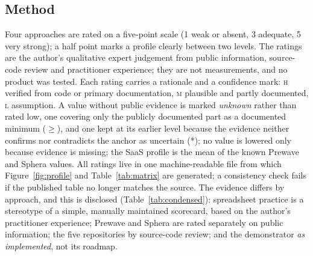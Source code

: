 \documentclass[10pt,twocolumn,a4paper]{article}
\begin{document}
\subsection{Method}
Four approaches are rated on a five-point scale (1 weak or absent, 3 adequate, 5 very
strong); a half point marks a profile clearly between two levels. The ratings are the
author's qualitative expert judgement from public information, source-code review and
practitioner experience; they are not measurements, and no product was tested. Each rating carries a rationale and a confidence mark: \textsc{h} verified from
code or primary documentation, \textsc{m} plausible and partly documented, \textsc{l}
assumption. A value without public evidence is marked \emph{unknown} rather than rated low,
one covering only the publicly documented part as a documented minimum ($\geq$), and one kept at
its earlier level because the evidence neither confirms nor contradicts the anchor as uncertain (*);
no value is lowered only because evidence is missing; the SaaS
profile is the mean of the known Prewave and Sphera values. All ratings live in one machine-readable file from which
Figure~\ref{fig:profile} and Table~\ref{tab:matrix} are generated; a consistency check
fails if the published table no longer matches the source. The evidence differs by
approach, and this is disclosed (Table~\ref{tab:condensed}): spreadsheet practice is a
stereotype of a simple, manually maintained scorecard, based on the author's practitioner
experience; Prewave and Sphera are rated separately on
public information; the five repositories by source-code review; and the demonstrator
\emph{as implemented}, not its roadmap.
\end{document}
